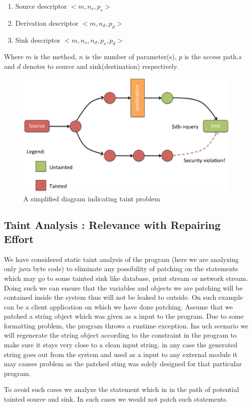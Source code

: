 \begin{enumerate}
	\item Source descriptor $<m,n_s,p_s>$
	\item Derivation descriptor $<m,n_d,p_d>$
	\item Sink descriptor $<m,n_s,n_d,p_s,p_d>$
\end{enumerate}
Where $m$ is the method, $n$ is the number of parameter(s), $p$ is the access
path.$s$ and $d$ denotes to source and sink(destination) respectively.
\begin{figure}[t]
\centering
\includegraphics[scale=.3]{images/Taint.png}
\caption{A simplified diagram indicating taint problem}
\label{fig:taint}
\end{figure}

\subsection{Taint Analysis : Relevance with Repairing Effort}
\label{subsec:TaintRepairing}

We have considered static taint analysis of the program (here we are analyzing
only java byte code) to eliminate any possibility of patching on the statements
which may go to some tainted sink like database, print stream or network stream.
Doing such we can ensure that the variables and objects we are patching will be
contained inside the system thus will not be leaked to outside. On such example
can be a client application on which we have done patching. Assume that we
patched a string object which was given as a input to the program. Due to some
formatting problem, the program throws a runtime exception. Ins uch scenario we
will regenerate the string object according to the constraint in the program to
make sure it stays very close to a clean input string. in any case the generated
string goes out from the system and used as a input to any external module it
may causes problem as the patched sting was solely designed for that particular
program. 

To avoid such cases we analyze the statement which in in the path of potential
tainted source and sink. In such cases we would not patch such statements.
